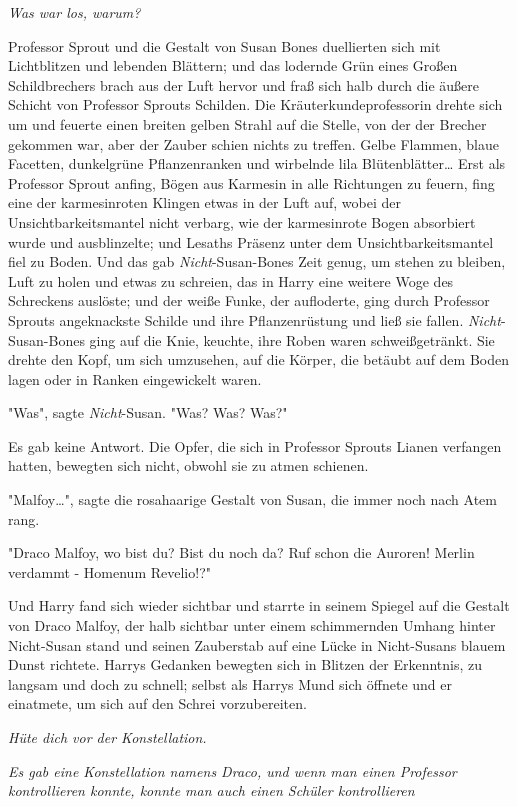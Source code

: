 {\emph{Was war los, warum?}

Professor Sprout und die Gestalt von Susan Bones duellierten sich mit Lichtblitzen und lebenden Blättern; und das lodernde Grün eines Großen Schildbrechers brach aus der Luft hervor und fraß sich halb durch die äußere Schicht von Professor Sprouts Schilden. Die Kräuterkundeprofessorin drehte sich um und feuerte einen breiten gelben Strahl auf die Stelle, von der der Brecher gekommen war, aber der Zauber schien nichts zu treffen. Gelbe Flammen, blaue Facetten, dunkelgrüne Pflanzenranken und wirbelnde lila Blütenblätter… Erst als Professor Sprout anfing, Bögen aus Karmesin in alle Richtungen zu feuern, fing eine der karmesinroten Klingen etwas in der Luft auf, wobei der Unsichtbarkeitsmantel nicht verbarg, wie der karmesinrote Bogen absorbiert wurde und ausblinzelte; und Lesaths Präsenz unter dem Unsichtbarkeitsmantel fiel zu Boden. Und das gab \emph{Nicht}-Susan-Bones Zeit genug, um stehen zu bleiben, Luft zu holen und etwas zu schreien, das in Harry eine weitere Woge des Schreckens auslöste; und der weiße Funke, der aufloderte, ging durch Professor Sprouts angeknackste Schilde und ihre Pflanzenrüstung und ließ sie fallen. \emph{Nicht}-Susan-Bones ging auf die Knie, keuchte, ihre Roben waren schweißgetränkt. Sie drehte den Kopf, um sich umzusehen, auf die Körper, die betäubt auf dem Boden lagen oder in Ranken eingewickelt waren.

"Was", sagte \emph{Nicht}-Susan. "Was? Was? Was?"

Es gab keine Antwort. Die Opfer, die sich in Professor Sprouts Lianen verfangen hatten, bewegten sich nicht, obwohl sie zu atmen schienen.

"Malfoy…", sagte die rosahaarige Gestalt von Susan, die immer noch nach Atem rang.

"Draco Malfoy, wo bist du? Bist du noch da? Ruf schon die Auroren! Merlin verdammt - Homenum Revelio!?"

Und Harry fand sich wieder sichtbar und starrte in seinem Spiegel auf die Gestalt von Draco Malfoy, der halb sichtbar unter einem schimmernden Umhang hinter Nicht-Susan stand und seinen Zauberstab auf eine Lücke in Nicht-Susans blauem Dunst richtete. Harrys Gedanken bewegten sich in Blitzen der Erkenntnis, zu langsam und doch zu schnell; selbst als Harrys Mund sich öffnete und er einatmete, um sich auf den Schrei vorzubereiten.

\emph{Hüte dich vor der Konstellation.}

\emph{Es gab eine Konstellation namens Draco, und wenn man einen Professor kontrollieren konnte, konnte man auch einen Schüler kontrollieren}

}
